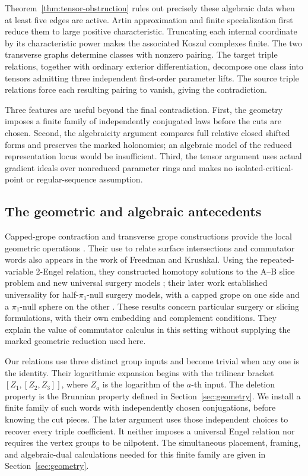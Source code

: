 Theorem~\ref{thm:tensor-obstruction} rules out precisely these algebraic
data when at least five edges are active. Artin approximation and finite
specialization first reduce them to large positive characteristic.
Truncating each internal coordinate by its characteristic power makes
the associated Koszul complexes finite. The two transverse graphs
determine classes with nonzero pairing. The target triple relations,
together with ordinary exterior differentiation, decompose one class
into tensors admitting three independent first-order parameter lifts.
The source triple relations force each resulting pairing to vanish,
giving the contradiction.

Three features are useful beyond the final contradiction. First, the geometry
imposes a finite family of independently conjugated laws before the cuts are
chosen. Second, the algebraicity argument compares full relative closed shifted
forms and preserves the marked holonomies; an algebraic model of the reduced
representation locus would be insufficient. Third, the tensor argument uses
actual gradient ideals over nonreduced parameter rings and makes no
isolated-critical-point or regular-sequence assumption.

\subsection{The geometric and algebraic antecedents}

Capped-grope contraction and transverse grope constructions provide the
local geometric operations \cite[\S\S1.2 and 1.4]{KQ2000}.
Their use to relate surface intersections and commutator words also
appears in the work of Freedman and Krushkal. Using the repeated-variable
2-Engel relation, they constructed homotopy solutions to the A--B slice
problem and new universal surgery models
\cite[Theorems~1 and~2]{FK2016}; their later work established universality
for half-\(\pi_1\)-null surgery models, with a capped grope on one side
and a \(\pi_1\)-null sphere on the other
\cite[Theorem~1 and Section~3]{FK2020}.
These results concern particular surgery or slicing formulations, with
their own embedding and complement conditions. They explain the value
of commutator calculus in this setting without supplying the marked
geometric reduction used here.

Our relations use three distinct group inputs and become trivial when
any one is the identity. Their logarithmic expansion begins with the
trilinear bracket \([Z_1,[Z_2,Z_3]]\), where \(Z_a\) is the logarithm
of the \(a\)-th input. The deletion property is the Brunnian property defined in
Section~\ref{sec:geometry}. We install a finite family of such words
with independently chosen conjugations, before knowing the cut pieces.
The later argument uses those independent choices to recover every
triple coefficient. It neither imposes a universal Engel relation nor
requires the vertex groups to be nilpotent. The simultaneous placement,
framing, and algebraic-dual calculations needed for this finite family
are given in Section~\ref{sec:geometry}.

